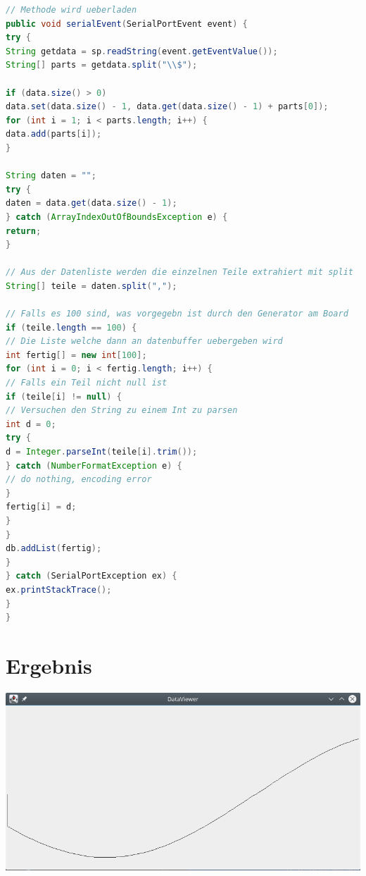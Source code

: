 \begin{lstlisting}[language=Java]
// Methode wird ueberladen
public void serialEvent(SerialPortEvent event) {
try {
String getdata = sp.readString(event.getEventValue());
String[] parts = getdata.split("\\$");

if (data.size() > 0)
data.set(data.size() - 1, data.get(data.size() - 1) + parts[0]);
for (int i = 1; i < parts.length; i++) {
data.add(parts[i]);
}

String daten = "";
try {
daten = data.get(data.size() - 1);
} catch (ArrayIndexOutOfBoundsException e) {
return;
}

// Aus der Datenliste werden die einzelnen Teile extrahiert mit split
String[] teile = daten.split(",");

// Falls es 100 sind, was vorgegebn ist durch den Generator am Board
if (teile.length == 100) {
// Die Liste welche dann an datenbuffer uebergeben wird
int fertig[] = new int[100];
for (int i = 0; i < fertig.length; i++) {
// Falls ein Teil nicht null ist
if (teile[i] != null) {
// Versuchen den String zu einem Int zu parsen
int d = 0;
try {
d = Integer.parseInt(teile[i].trim());
} catch (NumberFormatException e) {
// do nothing, encoding error
}
fertig[i] = d;
}
}
db.addList(fertig);
}
} catch (SerialPortException ex) {
ex.printStackTrace();
}
}
\end{lstlisting}


\section{Ergebnis}
\begin{minipage}{\linewidth}
	\centering
	\includegraphics[width=0.8\linewidth]{images/ergebnis}
\end{minipage}
